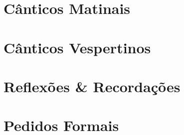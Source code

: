 
\morningPartSettings

\part{Cânticos Matinais}

\morningChapterSettings



\morningSettingsRestore

\eveningPartSettings

\part{Cânticos Vespertinos}

\eveningChapterSettings



\eveningSettingsRestore


\part{Reflexões \& Recordações}





\requestsPartSettings


\part{Pedidos Formais}

\requestsChapterSettings



\requestsSettingsRestore
